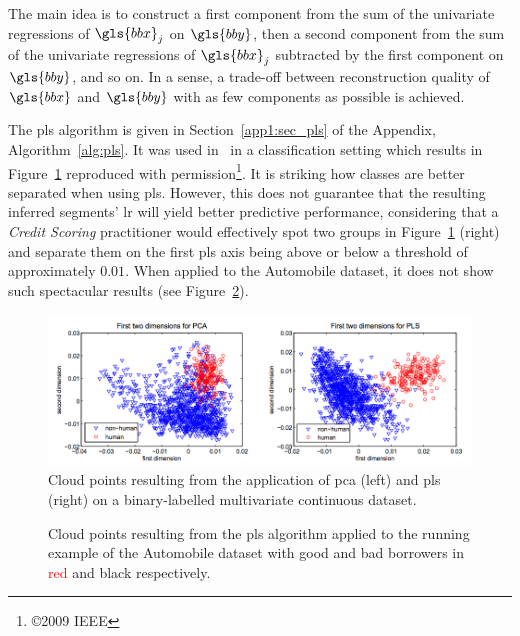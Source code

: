 The main idea is to construct a first component from the sum of the univariate regressions of $\gls{bbx}_j$ on $\gls{bby}$, then a second component from the sum of the univariate regressions of $\gls{bbx}_j$ subtracted by the first component on $\gls{bby}$, and so on. In a sense, a trade-off between reconstruction quality of $\gls{bbx}$ and $\gls{bby}$ with as few components as possible is achieved.

The \gls{pls} algorithm is given in Section~\ref{app1:sec_pls} of the Appendix, Algorithm~\ref{alg:pls}. It was used in~\cite{schwartz2009human} in a classification setting which results in Figure~\ref{fig:pca_vs_pls} reproduced with permission\footnote{\copyright 2009 IEEE}. It is striking how classes are better separated when using \gls{pls}. However, this does not guarantee that the resulting inferred segments' \gls{lr} will yield better predictive performance, considering that a \textit{Credit Scoring} practitioner would effectively spot two groups in Figure~\ref{fig:pca_vs_pls} (right) and separate them on the first \gls{pls} axis being above or below a threshold of approximately $0.01$. When applied to the Automobile dataset, it does not show such spectacular results (see Figure~\ref{fig:simu_pls}).

\begin{figure}
\includegraphics[width = \textwidth]{figures/chapitre6/pca_vs_pls.png}
\caption{Cloud points resulting from the application of \gls{pca} (left) and \gls{pls} (right) on a binary-labelled multivariate continuous dataset.}
\label{fig:pca_vs_pls}
\end{figure}

\begin{figure}
\centering \resizebox{.8\textwidth}{!}{}
\caption{Cloud points resulting from the \gls{pls} algorithm applied to the running example of the Automobile dataset with good and bad borrowers in \textcolor{red}{red} and black respectively.}
\label{fig:simu_pls}
\end{figure}


